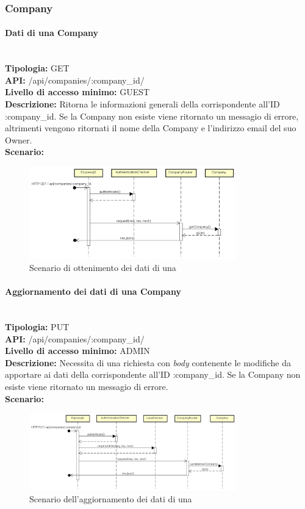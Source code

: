 \newpage
\subsubsection{Company}
\paragraph{Dati di una Company}\mbox{}\\
\textbf{Tipologia:} GET \\
\textbf{API:} /api/companies/:company\_id/ \\
\textbf{Livello di accesso minimo:} GUEST \\
\textbf{Descrizione:} Ritorna le informazioni generali della  corrispondente all'ID :company\_id. Se la Company non esiste viene ritornato un messagio di errore, altrimenti vengono ritornati il nome della Company e l'indirizzo email del suo Owner. \\
\textbf{Scenario:} 
\begin{figure}[H]
\centering
\includegraphics[width=0.8\textwidth]{res/sections/backend/sequence/(GET)company.png}
\caption{Scenario di ottenimento dei dati di una }
\end{figure}

\newpage
\paragraph{Aggiornamento dei dati di una Company}\mbox{}\\
\textbf{Tipologia:} PUT \\
\textbf{API:} /api/companies/:company\_id/ \\
\textbf{Livello di accesso minimo:} ADMIN \\
\textbf{Descrizione:} Necessita di una richiesta con \textit{body} contenente le modifiche da apportare ai dati della  corrispondente all'ID :company\_id. Se la Company non esiste viene ritornato un messagio di errore. \\
\textbf{Scenario:} 
\begin{figure}[H]
\centering
\includegraphics[width=0.8\textwidth]{res/sections/backend/sequence/(PUT)company.png}
\caption{Scenario dell'aggiornamento dei dati di una }
\end{figure}

